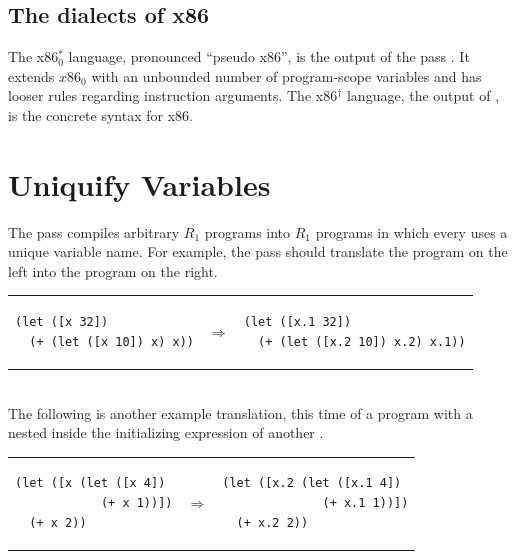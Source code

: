 \documentclass[11pt]{book}
\begin{document}
\subsection{The dialects of x86}

The x86$^{*}_0$ language, pronounced ``pseudo x86'', is the output of
the pass . It extends $x86_0$ with an
unbounded number of program-scope variables and has looser rules
regarding instruction arguments. The x86$^{\dagger}$ language, the
output of , is the concrete syntax for x86.


\section{Uniquify Variables}
\label{sec:uniquify-s0}

The  pass compiles arbitrary $R_1$ programs into $R_1$
programs in which every  uses a unique variable name. For
example, the  pass should translate the program on the
left into the program on the right. \\
\begin{tabular}{lll}
\begin{minipage}{0.4\textwidth}
\begin{lstlisting}
(let ([x 32])
  (+ (let ([x 10]) x) x))
\end{lstlisting}
\end{minipage}
&
$\Rightarrow$
&
\begin{minipage}{0.4\textwidth}
\begin{lstlisting}
(let ([x.1 32])
  (+ (let ([x.2 10]) x.2) x.1))
\end{lstlisting}
\end{minipage}
\end{tabular} \\
%
The following is another example translation, this time of a program
with a  nested inside the initializing expression of another
.\\
\begin{tabular}{lll}
\begin{minipage}{0.4\textwidth}
\begin{lstlisting}
(let ([x (let ([x 4])
            (+ x 1))])
  (+ x 2))
\end{lstlisting}
\end{minipage}
&
$\Rightarrow$
&
\begin{minipage}{0.4\textwidth}
\begin{lstlisting}
(let ([x.2 (let ([x.1 4])
              (+ x.1 1))])
  (+ x.2 2))
\end{lstlisting}
\end{minipage}
\end{tabular}
\end{document}
